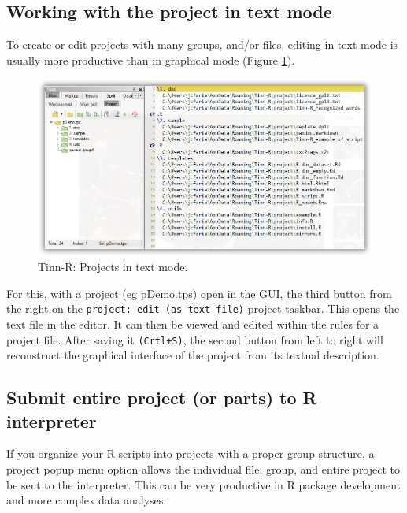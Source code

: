 \subsection{Working with the project in text mode}
To create or edit projects with many groups, and/or files, editing in text mode is usually 
more productive than in graphical mode (Figure \ref{fig:tinn-r_projects_text_mode}).

\begin{figure}[H]
  \begin{center}
    \includegraphics[scale=0.60]{./res/projects_text_mode.png}
  \end{center}
  \caption{Tinn-R: Projects in text mode.}
  \label{fig:tinn-r_projects_text_mode}
\end{figure}

For this, with a project (eg pDemo.tps) open in the GUI, the third button from the right  
on the \texttt{project: edit (as text file)} project taskbar.  This opens the text file in the editor. 
It can then be viewed and edited within the rules for a project file.  
After saving it \texttt{(Crtl+S)}, the second button from left to right will reconstruct the  
graphical interface of the project from its textual description.

\subsection{Submit entire project (or parts) to R interpreter}
If you organize your R scripts into projects with a proper group structure, 
a project popup menu option allows the individual file, group, and entire project to be sent to the interpreter. 
This can be very productive in R package development and more complex data analyses.

